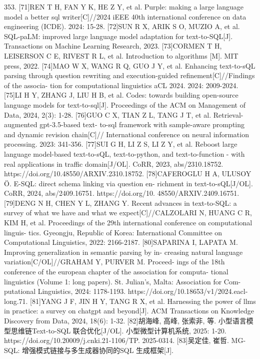 \documentclass[12pt,a4paper,openright,UTF8]{ctexbook}
\begin{document}
353.
[71]REN T H, FAN Y K, HE Z Y, et al. Purple: making a large language model a
better sql writer[C]//2024 iEEE 40th international conference on data engineering
(ICDE). 2024: 15-28.
[72]SUN R X, ARIK S O, MUZIO A, et al. SQL-paLM: improved large language
model adaptation for text-to-SQL[J]. Transactions on Machine Learning Research,
2023.
[73]CORMEN T H, LEISERSON C E, RIVEST R L, et al. Introduction to algorithms
[M]. MIT press, 2022.
[74]MAO W X, WANG R Q, GUO J Y, et al. Enhancing text-to-sQL parsing through
question rewriting and execution-guided refinement[C]//Findings of the associa-
tion for computational linguistics aCL 2024. 2024: 2009-2024.
[75]LI H Y, ZHANG J, LIU H B, et al. Codes: towards building open-source language
models for text-to-sql[J]. Proceedings of the ACM on Management of Data, 2024,
2(3): 1-28.
[76]GUO C X, TIAN Z L, TANG J T, et al. Retrieval-augmented gpt-3.5-based text-
to-sql framework with sample-aware prompting and dynamic revision chain[C]//
International conference on neural information processing. 2023: 341-356.
[77]SUI G H, LI Z S, LI Z Y, et al. Reboost large language model-based text-to-sQL,
text-to-python, and text-to-function - with real applications in traffic domain[J/OL].
CoRR, 2023, abs/2310.18752. https://doi.org/10.48550/ARXIV.2310.18752.
[78]CAFEROGLU H A, ULUSOY Ö. E-SQL: direct schema linking via question en-
richment in text-to-sQL[J/OL]. CoRR, 2024, abs/2409.16751. https://doi.org/10.
48550/ARXIV.2409.16751.
[79]DENG N H, CHEN Y L, ZHANG Y. Recent advances in text-to-SQL: a survey
of what we have and what we expect[C]//CALZOLARI N, HUANG C R, KIM H,
et al. Proceedings of the 29th international conference on computational linguis-
tics. Gyeongju, Republic of Korea: International Committee on Computational
Linguistics, 2022: 2166-2187.
[80]SAPARINA I, LAPATA M. Improving generalization in semantic parsing by in-
creasing natural language variation[C/OL]//GRAHAM Y, PURVER M. Proceed-
ings of the 18th conference of the european chapter of the association for computa-
tional linguistics (Volume 1: long papers). St. Julian’s, Malta: Association for Com-
putational Linguistics, 2024: 1178-1193. https://doi.org/10.18653/v1/2024.eacl-
long.71.
[81]YANG J F, JIN H Y, TANG R X, et al. Harnessing the power of llms in practice:
a survey on chatgpt and beyond[J]. ACM Transactions on Knowledge Discovery
from Data, 2024, 18(6): 1-32.
[82]胡海峰, 高峰, 张索非, 等. 小型语言模型思维链Text-to-SQL 联合优化[J/OL].
小型微型计算机系统, 2025: 1-20. https://doi.org/10.20009/j.cnki.21-1106/TP.
2025-0314.
[83]吴定佳, 崔哲. MG-SQL: 增强模式链接与多生成器协同的SQL 生成框架[J].
\end{document}
